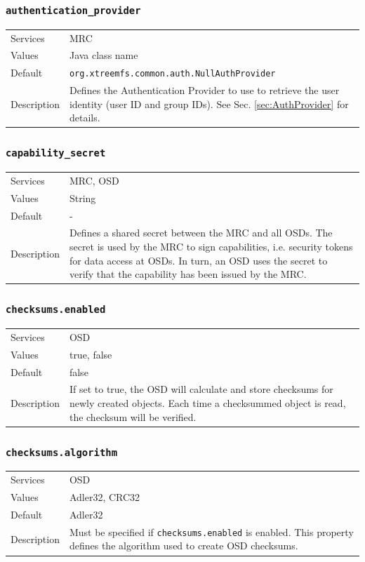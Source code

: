 \documentclass[a4paper,10pt]{book}
\begin{document}
\subsubsection{\texttt{authentication\_provider}}
\begin{tabular}{lp{10cm}}
 Services & MRC\\
 Values   & Java class name \\
 Default  & \texttt{org.xtreemfs.common.auth.NullAuthProvider}\\
 Description & Defines the Authentication Provider to use to retrieve the user identity (user ID and group IDs). See Sec. \ref{sec:AuthProvider} for details.
\end{tabular}

\subsubsection{\texttt{capability\_secret}}
\begin{tabular}{lp{10cm}}
 Services & MRC, OSD\\
 Values   & String \\
 Default  & - \\
 Description & Defines a shared secret between the MRC and all OSDs. The secret is used by the MRC to sign capabilities, i.e. security tokens for data access at OSDs. In turn, an OSD uses the secret to verify that the capability has been issued by the MRC.
\end{tabular}

\subsubsection{\texttt{checksums.enabled}}
\begin{tabular}{lp{10cm}}
 Services & OSD\\
 Values   & true, false \\
 Default  & false \\
 Description & If set to true, the OSD will calculate and store checksums for newly created objects. Each time a checksummed object is read, the checksum will be verified.
\end{tabular}

\subsubsection{\texttt{checksums.algorithm}}
\begin{tabular}{lp{10cm}}
 Services & OSD\\
 Values   & Adler32, CRC32 \\
 Default  & Adler32 \\
 Description & Must be specified if \texttt{checksums.enabled} is enabled. This property defines the algorithm used to create OSD checksums.
\end{tabular}
\end{document}
